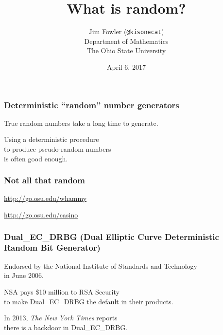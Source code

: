 \documentclass[14pt,aspectratio=169]{beamer}
\author{Jim Fowler (\texttt{@kisonecat})\\ Department of Mathematics \\ The Ohio State University}
\date{April 6, 2017}
\title{What is random?}
\begin{document}
\begin{frame}
\maketitle
\end{frame}


\begin{frame}
  \frametitle{Deterministic ``random'' number generators}

  \large

  True random numbers take a long time to generate.

  \vfill

  Using a deterministic procedure \\
  \quad to produce pseudo-random numbers\\
  \quad is often good enough.

\end{frame}

\begin{frame}
  \frametitle{Not all that random}

  \url{http://go.osu.edu/whammy}

  \url{http://go.osu.edu/casino}
\end{frame}

\begin{frame}
\frametitle{\normalsize Dual\_EC\_DRBG (Dual Elliptic Curve Deterministic Random Bit Generator)}

    Endorsed by the National Institute of Standards and Technology \\
    \quad in June 2006.

    \pause\vfill

    NSA pays \$10 million to RSA Security \\
    \quad to make Dual\_EC\_DRBG the default in their products.

    \pause\vfill

    In 2013, \textit{The New York Times} reports \\
    \quad there is a backdoor in Dual\_EC\_DRBG.

\end{frame}
\end{document}
